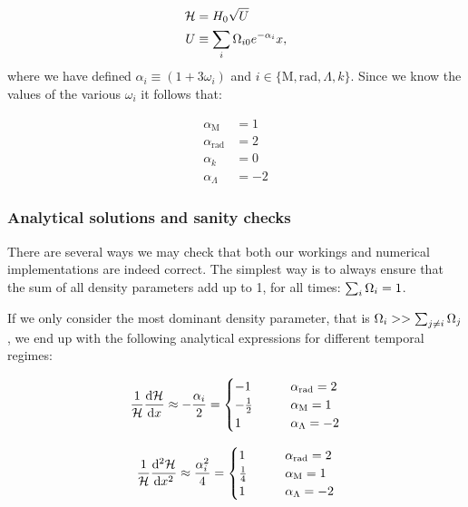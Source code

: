     \begin{equation}
        \begin{split}
            \mathcal{H} &= H_0\sqrt{U}\\
            U &\equiv \sum_i\Omega_{i0}e^{-\alpha_i}x, 
        \end{split}
    \end{equation}
    where we have defined $\alpha_i\equiv(1+3\omega_i)$ and $i\in\{\mathrm{M}, \mathrm{rad}, \Lambda, k\}$. Since we know the values of the various $\omega_i$ it follows that:
    
    \begin{equation}
        \label{eq:m1:theory:lambdaCDM:alpha_values}
        \begin{split}
            \alpha_\mathrm{M} &= 1\\
            \alpha_\mathrm{rad} &= 2\\
            \alpha_k &= 0\\
            \alpha_\Lambda &= -2
        \end{split}
    \end{equation}

  


\subsubsection{Analytical solutions and sanity checks}
    There are several ways we may check that both our workings and numerical implementations are indeed correct. The simplest way is to always ensure that the sum of all density parameters add up to 1, for all times: $\sum_i\Omega_i=1$. 
    
    If we only consider the most dominant density parameter, that is $\Omega_i >> \sum_{j\neq i}\Omega_j$, we end up with the following analytical expressions for different temporal regimes:

    \begin{equation}
        \label{eq:m1:theory:sanity:first_deriv_sanity}
        \frac{1}{\mathcal{H}}\dv{\mathcal{H}}{x} \approx - \frac{\alpha_i}{2} = 
        \begin{cases}
            -1 \qquad &\alpha_\mathrm{rad} = 2 \\
            -\frac{1}{2} \qquad &\alpha_\mathrm{M} = 1\\
            1 \qquad &\alpha_\Lambda = -2
        \end{cases}
    \end{equation}

    \begin{equation}
        \label{eq:m1:theory:sanity:second_deriv_sanity}
        \frac{1}{\mathcal{H}}\dv[2]{\mathcal{H}}{x} \approx \frac{\alpha_i^2}{4} = 
        \begin{cases}
            1 \qquad &\alpha_\mathrm{rad} = 2 \\
            \frac{1}{4} \qquad &\alpha_\mathrm{M} = 1\\
            1 \qquad &\alpha_\Lambda = -2
        \end{cases}
    \end{equation}

